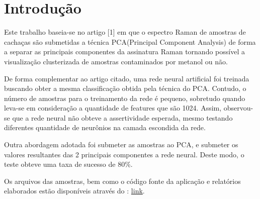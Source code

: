 \documentclass{article}
\begin{document}
\pagestyle{empty} 
\sloppy
{}

\begin{abstract}
O presente trabalho valida a utilização de redes neurais artificiais na interpretação de dados do espectro Raman de amostras de cachaça. Combinando a modelagem a técnica PCA(Principal Component Analysis) de forma a maximizar a taxa de sucesso obtida. \vspace{2cm}
\end{abstract}

\section{Introdução}
\vspace{1cm} 
Este trabalho baseia-se no artigo [1] em que o espectro Raman de amostras de cachaças são submetidas a técnica PCA(Principal Component Analysis) de forma a separar as principais componentes da assinatura Raman tornando possível a visualização clusterizada de amostras contaminados por metanol ou não.

De forma complementar ao artigo citado, uma rede neural artificial foi treinada buscando obter a mesma classificação obtida pela técnica do PCA. Contudo, o número de amostras para o treinamento da rede é pequeno, sobretudo quando leva-se em consideração a quantidade de features que são 1024. Assim, observou-se que a rede neural não obteve a assertividade esperada, mesmo testando diferentes quantidade de neurônios na camada escondida da rede.

Outra abordagem adotada foi submeter as amostras ao PCA, e submeter os valores resultantes das 2 principais componentes a rede neural. Deste modo, o teste obteve uma taxa de sucesso de 80\%.

Os arquivos das amostras, bem como o código fonte da aplicação e relatórios elaborados estão disponíveis através do : \href{https://github.com/danielscosta/mestrado/tree/master/disciplinas/Inteligencia_Artificial/projeto}{link}.
\end{document}
